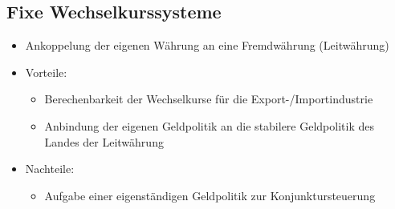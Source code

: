 \subsection{Fixe Wechselkurssysteme}
\begin{itemize}
	\item Ankoppelung der eigenen Währung an eine Fremdwährung (Leitwährung)
	\item Vorteile:
	\begin{itemize}
		\item Berechenbarkeit der Wechselkurse für die Export-/Importindustrie
		\item Anbindung der eigenen Geldpolitik an die stabilere Geldpolitik des Landes der Leitwährung
	\end{itemize}
	\item Nachteile:
	\begin{itemize}
		\item Aufgabe einer eigenständigen Geldpolitik zur Konjunktursteuerung
	\end{itemize}
\end{itemize}
\clearpage

